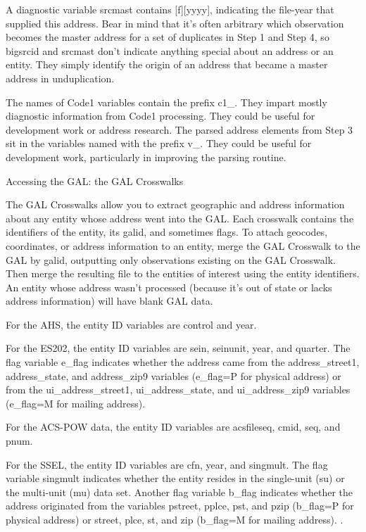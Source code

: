 A diagnostic variable srcmast contains [f][yyyy], indicating the file-year that supplied this address. Bear
in mind that it's often arbitrary which observation becomes the master address for a set of duplicates in
Step 1 and Step 4, so bigsrcid and srcmast don't indicate anything special about an address or an entity.
They simply identify the origin of an address that became a master address in unduplication. 

The names of Code1 variables contain the prefix c1_. They impart mostly diagnostic information from
Code1 processing. They could be useful for development work or address research. The parsed address
elements from Step 3 sit in the variables named with the prefix v_. They could be useful for development
work, particularly in improving the parsing routine. 


             Accessing the GAL: the GAL Crosswalks

The GAL Crosswalks allow you to extract geographic and address information about any entity whose
address went into the GAL. Each crosswalk contains the identifiers of the entity, its galid, and sometimes
flags. To attach geocodes, coordinates, or address information to an entity, merge the GAL Crosswalk to
the GAL by galid, outputting only observations existing on the GAL Crosswalk. Then merge the
resulting file to the entities of interest using the entity identifiers. An entity whose address wasn't
processed (because it's out of state or lacks address information) will have blank GAL data. 

For the AHS, the entity ID variables are control and year. 

For the ES202, the entity ID variables are sein, seinunit, year, and quarter. The flag variable e_flag
indicates whether the address came from the address_street1, address_state, and address_zip9
variables (e_flag=P for physical address) or from the ui_address_street1, ui_address_state, and
ui_address_zip9 variables (e_flag=M for mailing address). 

For the ACS-POW data, the entity ID variables are acsfileseq, cmid, seq, and pnum. 

For the SSEL, the entity ID variables are cfn, year, and singmult. The flag variable singmult indicates
whether the entity resides in the single-unit (su) or the multi-unit (mu) data set. Another flag variable
b_flag indicates whether the address originated from the variables pstreet, pplce, pst, and pzip
(b_flag=P for physical address) or street, plce, st, and zip (b_flag=M for mailing address). . 

